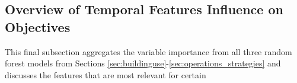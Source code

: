 \subsection{Overview of Temporal Features Influence on Objectives}
\label{sec:overviewuroftemporalfeat}

This final subsection aggregates the variable importance from all three random forest models from Sections \ref{sec:buildinguse}-\ref{sec:operations_strategies} and discusses the features that are most relevant for certain




